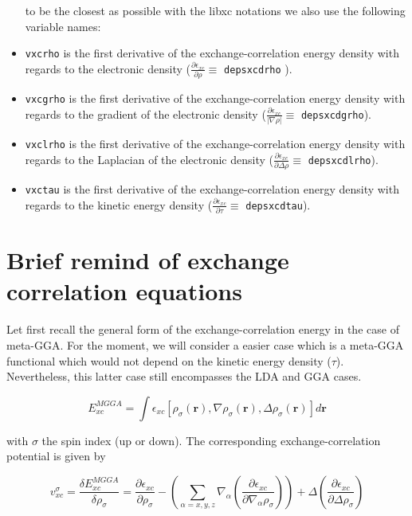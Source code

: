 \documentclass[a4paper,12pt]{report}
\begin{document}
\begin{itemize}
to be the closest as possible with the libxc notations we also use the following variable names:
 \item \texttt{vxcrho} is the first derivative of the exchange-correlation energy density with regards to the electronic density ($\frac{\partial \epsilon_{xc}}{\partial \rho}\equiv$ \texttt{depsxcdrho} ).
 \item \texttt{vxcgrho} is the first derivative of the exchange-correlation energy density with regards to the gradient of the electronic density ($\frac{\partial \epsilon_{xc}}{\vert \nabla \rho\vert}\equiv$ \texttt{depsxcdgrho}).
 \item \texttt{vxclrho} is the first derivative of the exchange-correlation energy density with regards to the Laplacian of the electronic density ($\frac{\partial \epsilon_{xc}}{\partial \Delta \rho}\equiv$ \texttt{depsxcdlrho}).
 \item \texttt{vxctau} is the first derivative of the exchange-correlation energy density with regards to the kinetic energy density ($\frac{\partial \epsilon_{xc}}{\partial \tau}\equiv$ \texttt{depsxcdtau}).
\end{itemize}

\chapter{Brief remind of exchange correlation equations}

Let first recall the general form of the exchange-correlation energy in the case of meta-GGA. For the moment, we will consider a easier case which is a meta-GGA functional which would not depend on the kinetic energy density ($\tau$). Nevertheless, this latter case still encompasses the LDA and GGA cases.

\begin{equation}
E_{xc}^{MGGA} = \int \epsilon_{xc} \left[ \rho_{\sigma}(\mathbf{r}), \nabla \rho_{\sigma}(\mathbf{r}), \Delta \rho_{\sigma}(\mathbf{r}) \right] d\mathbf{r}
\end{equation}

with $\sigma$ the spin index (up or down). The corresponding exchange-correlation potential is given by

\begin{equation}
v_{xc}^{\sigma} = \frac{\delta E_{xc}^{MGGA}}{\delta \rho_{\sigma}} = \frac{\partial \epsilon_{xc}}{\partial \rho_{\sigma}} - \left( \sum_{\alpha=x,y,z} \nabla_{\alpha} \left( \frac{\partial \epsilon_{xc}}{\partial \nabla_{\alpha} \rho_{\sigma}} \right)  \right) + \Delta \left( \frac{\partial \epsilon_{xc}}{\partial \Delta \rho_{\sigma}} \right) \label{eqvxc}
\end{equation}
\end{document}

